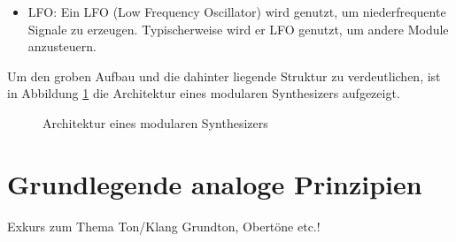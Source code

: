 \begin{itemize}
	\item LFO: \newline
	Ein LFO (Low Frequency Oscillator) wird genutzt, um niederfrequente Signale zu erzeugen.
	Typischerweise wird er LFO genutzt, um andere Module anzusteuern.
	
	
\end{itemize}

Um den groben Aufbau und die dahinter liegende Struktur zu verdeutlichen, ist in Abbildung \ref{fig:Produktarchitektur} die Architektur eines modularen Synthesizers aufgezeigt.

\begin{figure}[h]
	\centering
	\setlength{\fboxsep}{1pt} %
	\setlength{\fboxrule}{1pt} %
	\caption{Architektur eines  modularen Synthesizers}
	\label{fig:Produktarchitektur}
\end{figure}


\newpage
\section{Grundlegende analoge Prinzipien}
\label{sec:AnalogePrinzipien}

Exkurs zum Thema Ton/Klang 
Grundton, Obertöne etc.!




